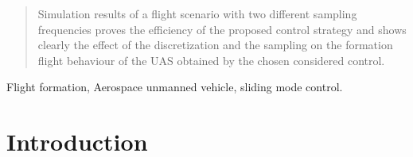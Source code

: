 \documentclass{ifacconf}
\begin{document}
\begin{frontmatter}
\begin{abstract}
Simulation results of a flight scenario with two different sampling frequencies proves the efficiency of the proposed control strategy and shows clearly the effect of the discretization and the sampling  on the formation flight behaviour of the UAS obtained by the chosen considered control.


%
%
\end{abstract}

\begin{keyword}
Flight formation, Aerospace unmanned vehicle, sliding mode control.
\end{keyword}

\end{frontmatter}

\section{Introduction}
\end{document}
